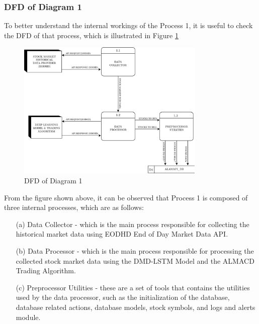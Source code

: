 \subsubsection{DFD of Diagram 1}
\label{subsubsec:dfd1}
To better understand the internal workings of the Process 1, 
it is useful to check the DFD of that process, which is illustrated in Figure \ref{fig:dfd1}
\begin{figure}[ht]
    \centering
    \includegraphics[width=0.80\textwidth]{./assets/Chapter_3/DFD/DFD_1.png}
    \caption{DFD of Diagram 1}
    \label{fig:dfd1}
\end{figure}
\FloatBarrier

From the figure shown above, it can be observed that Process 1 
is composed of three internal processes, which are as follows:
\begin{itemize}
    \item[(a)] Data Collector - which is the main process responsible 
    for collecting the historical market data using EODHD End of Day Market Data API.
    \item[(b)] Data Processor - which is the main process responsible for processing the collected 
    stock market data using the DMD-LSTM Model and the ALMACD Trading Algorithm.
    \item[(c)] Preprocessor Utilities - these are a set of tools that contains the 
    utilities used by the data processor, such as the initialization of the database, database related actions, 
    database models, stock symbols, and logs and alerts module.
\end{itemize}

